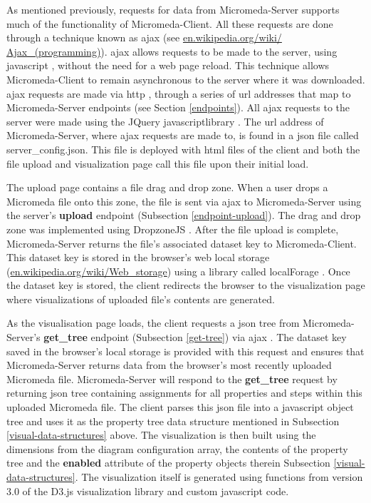 As mentioned previously, requests for data from Micromeda-Server supports much 
of the functionality of Micromeda-Client. All these requests are done through a 
technique known as \gls{ajax} \cite{garrett2005ajax,li2012jquery} (see 
\href{http://en.wikipedia.org/wiki/Ajax_(programming)}{en.wikipedia.org/wiki/ 
Ajax\_(programming)}). \gls{ajax} allows requests to be made to the server, 
using \gls{javascript} \cite{flanagan2006javascript}, without the need for a web 
page reload. This technique allows Micromeda-Client to remain asynchronous to  
the server where it was downloaded. \gls{ajax}  requests are made via \gls{http} 
\cite{fielding1999hypertext}, through a series of \gls{url} addresses 
\cite{berners1994rfc} that map to Micromeda-Server endpoints 
(see Section \ref{endpoints}). All \gls{ajax}  requests to the server were made 
using the JQuery \gls{javascript}library \cite{chaffer2013learning,li2012jquery}. 
The \gls{url} address of Micromeda-Server, where \gls{ajax}  requests are made 
to, is found in a \gls{json} file called server\_config.json. This file is deployed with 
\gls{html} files of the client and both the file upload and visualization page 
call this file upon their initial load.

The upload page contains a file drag and drop zone. When a user drops a 
Micromeda file onto this zone, the file is sent via \gls{ajax} to Micromeda-Server 
using the server's \textbf{upload} endpoint (Subsection \ref{endpoint-upload}). 
The drag and drop zone was implemented using DropzoneJS \cite{meno}. After the 
file upload is complete, Micromeda-Server returns the file's associated dataset 
key to Micromeda-Client. This dataset key is stored in the browser's web local 
storage \cite{Hickson} 
(\href{http://en.wikipedia.org/wiki/Web_storage}{en.wikipedia.org/wiki/Web\_storage}) 
using a library called localForage \cite{localforage}. Once the dataset key is 
stored, the client redirects the browser to the visualization page where 
visualizations of uploaded file's contents are generated.

As the visualisation page loads, the client requests a \gls{json} tree from 
Micromeda-Server's \textbf{get\_tree} endpoint (Subsection \ref{get-tree}) via 
\gls{ajax} . The dataset key saved in the browser's local storage is provided 
with this request and ensures that Micromeda-Server returns data from the 
browser's most recently uploaded Micromeda file. Micromeda-Server will respond 
to the \textbf{get\_tree} request by returning \gls{json} tree containing 
assignments for all properties and steps within this uploaded Micromeda file. 
The client parses this \gls{json} file into a \gls{javascript} object tree and 
uses it as the property tree data structure mentioned in Subsection 
\ref{visual-data-structures} above. The visualization is then built using the 
dimensions from the diagram configuration array, the contents of the property 
tree and the \textbf{enabled} attribute of the property objects therein 
Subsection \ref{visual-data-structures}. The visualization itself is generated 
using functions from version 3.0 of the D3.js visualization library 
\cite{bostock2015d3} and custom \gls{javascript} code.


